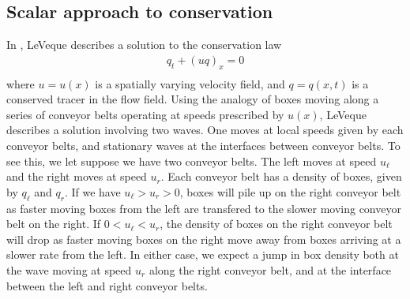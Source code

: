 \documentclass{article}
\begin{document}
\subsection{Scalar approach to conservation}
In \cite{le:2002}, LeVeque describes a solution to the conservation law
\begin{align}
q_t + (uq)_x = 0 \\
\end{align}
where $u = u(x)$ is a spatially varying velocity field, and $q = q(x,t)$ is a conserved  tracer in  the flow field.  Using the analogy of boxes moving along a series of conveyor belts operating
at speeds prescribed by $u(x)$, LeVeque describes a solution involving two waves. One moves at local speeds given by each conveyor belts, and stationary waves at the interfaces between conveyor belts.  To see this, we let suppose we have two conveyor belts. The left moves at speed $u_\ell$ and the right moves at speed $u_r$.  Each conveyor belt has a density of boxes, given by $q_\ell$ and $q_r$. 
If we have $u_\ell > u_r > 0$, boxes will pile up on the right conveyor belt  as faster moving boxes from the left are transfered to the slower moving conveyor belt on the right.  If $0 < u_\ell < u_r$, the density of boxes on the right conveyor belt will drop as faster moving boxes on the right move away from boxes arriving at a slower rate from the left.  In either case, we expect a jump 
in box density both at the wave moving at speed $u_r$ along the right conveyor belt, and at the interface between the left and right conveyor belts.
\end{document}
